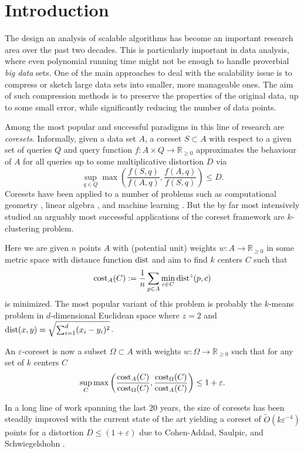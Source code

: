 \section{Introduction}

The design an analysis of scalable algorithms has become an important research area over the past two decades. This is particularly important in data analysis, where even polynomial running time might not be enough to handle proverbial \emph{big data} sets.
One of the main approaches to deal with the scalability issue is to compress or sketch large data sets into smaller, more manageable ones. The aim of such compression methods is to preserve the properties of the original data, up to some small error, while significantly reducing the number of data points.

Among the most popular and successful paradigms in this line of research are \emph{coresets}. Informally, given a data set $A$, a coreset $S\subset A$ with respect to a given set of queries $Q$ and query function $f: A\times Q \rightarrow \mathbb{R}_{\geq 0}$ approximates the behaviour of $A$ for all queries up to some multiplicative distortion $D$ via
$$ \sup_{q\in Q} \max\left( \frac{f(S,q)}{f(A,q)},\frac{f(A,q)}{f(S,q)}\right) \leq D.$$
Coresets have been applied to a number of problems such as computational geometry \cite{AHV05,Chan09}, linear algebra \cite{IndykMGR20,maalouf2019fast}, and machine learning \cite{MRM21,MunteanuSSW18}. But the by far most intensively studied an arguably most successful applications of the coreset framework are $k$-clustering problem.

Here we are given $n$ points $A$ with (potential unit) weights $w:A\rightarrow \mathbb{R}_{\geq 0}$ in some metric space with distance function $\text{dist}$ and aim to find $k$ centers $C$ such that 
$$\text{cost}_A(C):= \frac{1}{n} \sum_{p\in A}  \min_{c\in C} \text{dist}^z(p,c)$$
is minimized. The most popular variant of this problem is probably the $k$-means problem in $d$-dimensional Euclidean space where $z=2$ and $\text{dist}(x,y) = \sqrt{\sum_{i=1}^d (x_i-y_i)^2}$.

An $\varepsilon$-coreset is now a subset $\Omega\subset A$ with weights $w:\Omega\rightarrow \mathbb{R}_{\geq 0}$ such that for any set of $k$ centers $C$
\begin{equation}
\label{eq:coreset}
\sup_{C} \max\left( \frac{\text{cost}_A(C)}{\text{cost}_{\Omega}(C)},\frac{\text{cost}_{\Omega}(C)}{\text{cost}_{A}(C)}\right) \leq 1+\varepsilon.
\end{equation}

In a long line of work spanning the last 20 years\cite{BecchettiBC0S19,BravermanJKW21,Chen09,FL11,FeldmanSS20,
HaM04,HaK07,huang2020coresets,BravermanJKW21,LS10,SohlerW18}, the size of coresets has been steadily improved with the current state of the art yielding a coreset of $\tilde{O}(k\varepsilon^{-4})$ points for a distortion $D\leq (1+\varepsilon)$ due to Cohen-Addad, Saulpic, and Schwiegelshohn \cite{Cohen-AddadSS21}.


